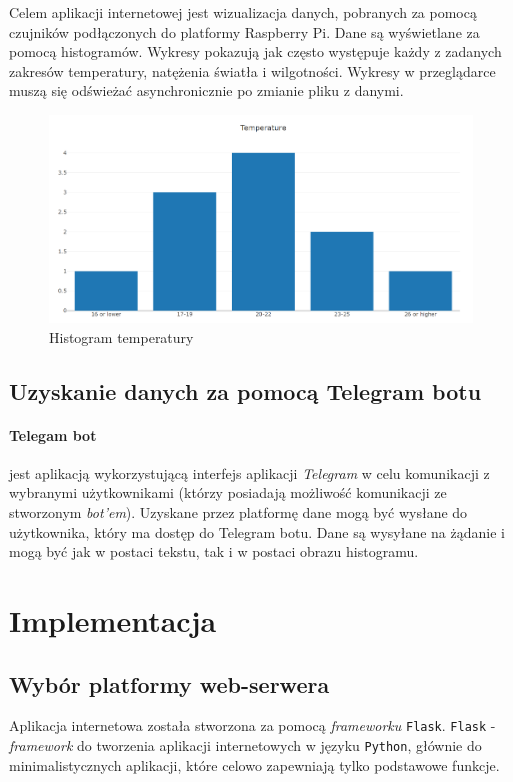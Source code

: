 \documentclass[a4paper]{article}
\begin{document}
Celem aplikacji internetowej jest wizualizacja danych, pobranych za pomocą czujników podłączonych do platformy Raspberry Pi.
Dane są wyświetlane za pomocą histogramów. Wykresy pokazują jak często występuje każdy z zadanych zakresów temperatury, natężenia światła i wilgotności.
Wykresy w przeglądarce muszą się odświeżać asynchronicznie po zmianie pliku z danymi.
\begin{figure}[H]
\centering
\includegraphics[scale=0.3]{exampleChart.png}
\caption{Histogram temperatury}
\end{figure}

\subsection{Uzyskanie danych za pomocą Telegram botu}

\paragraph{Telegam bot} jest aplikacją wykorzystującą interfejs aplikacji \textit{Telegram}
w celu komunikacji z wybranymi użytkownikami (którzy posiadają możliwość komunikacji ze stworzonym
\textit{bot'em}).\newline
Uzyskane przez platformę dane mogą być wysłane do użytkownika, który ma dostęp do Telegram botu. Dane są wysyłane na żądanie i mogą być jak w postaci tekstu, tak i w postaci obrazu histogramu.



\section{Implementacja}
       
        
        \subsection{Wybór platformy web-serwera}
	Aplikacja internetowa została stworzona za pomocą \textsl{frameworku} \texttt{Flask}. 
	\texttt{Flask} - \textsl{framework} do tworzenia aplikacji internetowych w języku \texttt{Python}, głównie do
	minimalistycznych aplikacji, które celowo zapewniają tylko podstawowe funkcje.
	
\end{document}
